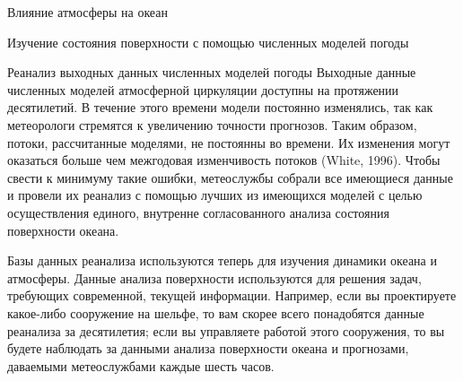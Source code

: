 \begin{chapter}{Влияние атмосферы на океан}
\begin{section}{Изучение состояния поверхности с помощью численных моделей погоды}
\begin{paragraph}{Реанализ выходных данных численных моделей погоды}
Выходные данные численных моделей атмосферной циркуляции доступны на
протяжении десятилетий. В течение этого времени модели постоянно
изменялись, так как метеорологи стремятся к увеличению точности
прогнозов. Таким образом, потоки, рассчитанные моделями, не постоянны
во времени. Их изменения могут оказаться больше чем межгодовая
изменчивость потоков (White, 1996). Чтобы свести к минимуму такие
ошибки, метеослужбы собрали все имеющиеся данные и провели их реанализ
с помощью лучших из имеющихся моделей с целью осуществления единого,
внутренне согласованного анализа состояния поверхности океана.
%

Базы данных реанализа используются теперь для изучения динамики океана
и атмосферы. Данные анализа поверхности используются для решения
задач, требующих современной, текущей информации. Например, если вы
проектируете какое-либо сооружение на шельфе, то вам скорее всего
понадобятся данные реанализа за десятилетия; если вы управляете
работой этого сооружения, то вы будете наблюдать за данными анализа
поверхности океана и прогнозами, даваемыми метеослужбами каждые шесть
часов.  
%
\end{paragraph}


\end{section}
\end{chapter}
